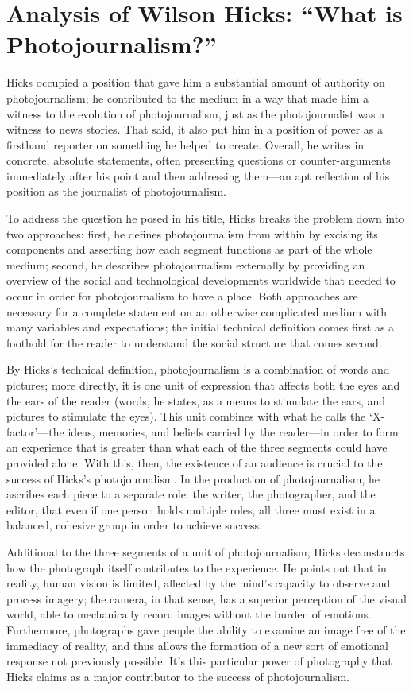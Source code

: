 \section{Analysis of Wilson Hicks: ``What is Photojournalism?''}

Hicks occupied a position that gave him a substantial amount of authority on
photojournalism; he contributed to the medium in a way that made him a witness
to the evolution of photojournalism, just as the photojournalist was a witness
to news stories. That said, it also put him in a position of power as a
firsthand reporter on something he helped to create. Overall, he writes in
concrete, absolute statements, often presenting questions or counter-arguments
immediately after his point and then addressing them---an apt reflection of his
position as the journalist of photojournalism.

To address the question he posed in his title, Hicks breaks the problem down
into two approaches: first, he defines photojournalism from within by excising
its components and asserting how each segment functions as part of the whole
medium; second, he describes photojournalism externally by providing an overview
of the social and technological developments worldwide that needed to occur in
order for photojournalism to have a place. Both approaches are necessary for a
complete statement on an otherwise complicated medium with many variables and
expectations; the initial technical definition comes first as a foothold for the
reader to understand the social structure that comes second.

By Hicks's technical definition, photojournalism is a combination of words and
pictures; more directly, it is one unit of expression that affects both the eyes
and the ears of the reader (words, he states, as a means to stimulate the ears,
and pictures to stimulate the eyes). This unit combines with what he calls the
`X-factor'---the ideas, memories, and beliefs carried by the reader---in order
to form an experience that is greater than what each of the three segments could
have provided alone. With this, then, the existence of an audience is crucial to
the success of Hicks's photojournalism. In the production of photojournalism, he
ascribes each piece to a separate role: the writer, the photographer, and the
editor, that even if one person holds multiple roles, all three must exist in a
balanced, cohesive group in order to achieve success.

Additional to the three segments of a unit of photojournalism, Hicks
deconstructs how the photograph itself contributes to the experience. He points
out that in reality, human vision is limited, affected by the mind's capacity to
observe and process imagery; the camera, in that sense, has a superior
perception of the visual world, able to mechanically record images without the
burden of emotions. Furthermore, photographs gave people the ability to examine
an image free of the immediacy of reality, and thus allows the formation of a
new sort of emotional response not previously possible. It's this particular
power of photography that Hicks claims as a major contributor to the success of
photojournalism.

